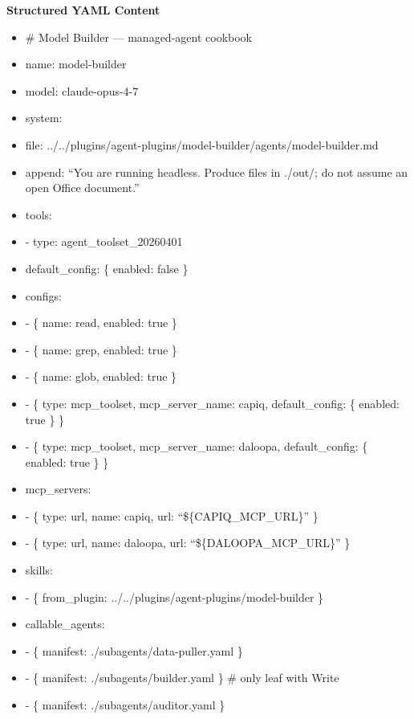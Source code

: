 \documentclass[11pt]{article}
\begin{document}
\textbf{Structured YAML Content}
\begin{itemize}[leftmargin=*,itemsep=2pt,topsep=2pt]
\item {} \# Model Builder — managed-agent cookbook
\item {} name: model-builder
\item {} model: claude-opus-4-7
\item {} system:
\item {} file: ../../plugins/agent-plugins/model-builder/agents/model-builder.md
\item {} append: ``You are running headless. Produce files in ./out/; do not assume an open Office document.''
\item {} tools:
\item {} - type: agent\_\allowbreak{}toolset\_\allowbreak{}20260401
\item {} default\_\allowbreak{}config: \{ enabled: false \}
\item {} configs:
\item {} - \{ name: read, enabled: true \}
\item {} - \{ name: grep, enabled: true \}
\item {} - \{ name: glob, enabled: true \}
\item {} - \{ type: mcp\_\allowbreak{}toolset, mcp\_\allowbreak{}server\_\allowbreak{}name: capiq, default\_\allowbreak{}config: \{ enabled: true \} \}
\item {} - \{ type: mcp\_\allowbreak{}toolset, mcp\_\allowbreak{}server\_\allowbreak{}name: daloopa, default\_\allowbreak{}config: \{ enabled: true \} \}
\item {} mcp\_\allowbreak{}servers:
\item {} - \{ type: url, name: capiq, url: ``\$\{CAPIQ\_\allowbreak{}MCP\_\allowbreak{}URL\}'' \}
\item {} - \{ type: url, name: daloopa, url: ``\$\{DALOOPA\_\allowbreak{}MCP\_\allowbreak{}URL\}'' \}
\item {} skills:
\item {} - \{ from\_\allowbreak{}plugin: ../../plugins/agent-plugins/model-builder \}
\item {} callable\_\allowbreak{}agents:
\item {} - \{ manifest: ./subagents/data-puller.yaml \}
\item {} - \{ manifest: ./subagents/builder.yaml \} \# only leaf with Write
\item {} - \{ manifest: ./subagents/auditor.yaml \}
\end{itemize}
\end{document}
